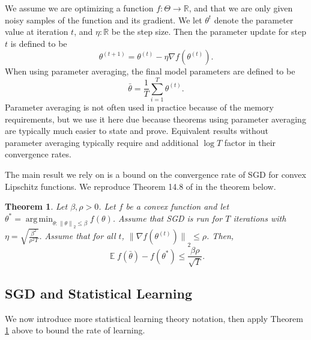 \documentclass[twoside]{article}
\newtheorem{theorem}{Theorem}
\DeclareMathOperator{\E}{\mathbb E}
\DeclareMathOperator*{\argmin}{arg\,min}
\renewcommand{\star}[1]{{#1}^{*}}
\newcommand{\ltwo}[1]{{\lVert {#1} \rVert}_2}
\begin{document}
We assume we are optimizing a function $f : \Theta \to \mathbb R$,
and that we are only given noisy samples of the function and its gradient.
We let $\theta^{t}$ denote the parameter value at iteration $t$,
and $\eta : \mathbb R$ be the step size.
Then the parameter update for step $t$ is defined to be
\begin{equation}
    \theta^{(t+1)} = \theta^{(t)} - \eta \nabla f(\theta^{(t)}).
\end{equation}
When using parameter averaging, the final model parameters are defined to be
\begin{equation}
    \bar\theta = \frac1T \sum_{i=1}^T \theta^{(t)}
    .
\end{equation}
Parameter averaging is not often used in practice because of the memory requirements,
but we use it here due because theorems using parameter averaging are typically much easier to state and prove.
Equivalent results without parameter averaging typically require and additional $\log T$ factor in their convergence rates\citep{}.

The main result we rely on is a bound on the convergence rate of SGD for convex Lipschitz functions.
We reproduce Theorem 14.8 of \citet{shalev2014understanding} in the theorem below.

\begin{theorem}
    \label{thm:sgd}
    Let $\beta,\rho>0$.
    Let $f$ be a convex function and let $\star \theta = \argmin_{\theta : \ltwo{\theta}\le \beta} f(\theta)$.
    Assume that SGD is run for $T$ iterations with $\eta = \sqrt{\frac{\beta^2}{\rho^2 T}}$.
    Assume that for all $t$, $\ltwo{\nabla f(\theta^{(t)})} \le \rho$.
    Then,
    \begin{equation}
        \E f(\bar \theta) - f(\star \theta) \le \frac{\beta\rho}{\sqrt{T}}
        .
    \end{equation}
\end{theorem}

\subsection{SGD and Statistical Learning}

We now introduce more statistical learning theory notation,
then apply Theorem \ref{thm:sgd} above to bound the rate of learning.
\end{document}
